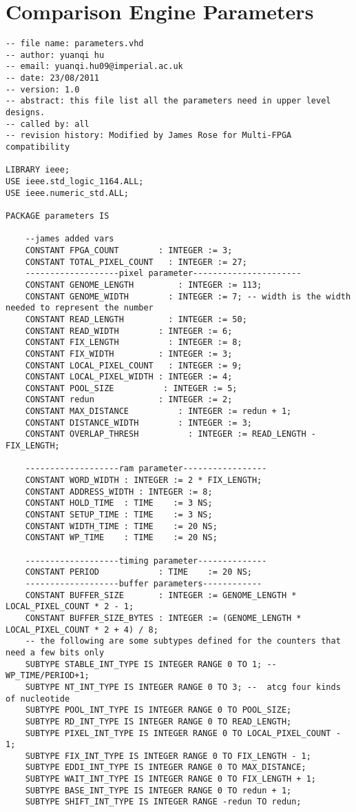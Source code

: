 \renewcommand{\baselinestretch}{1.5}
\chapter{Comparison Engine Parameters}
\label{App:default}

\lstset{language=python, numbers=left, showspaces=false,
    showstringspaces=false, tabsize=4, breaklines=true, basicstyle=\tiny, captionpos=b, numbersep=5pt }
\begin{lstlisting}[frame=single]
-- file name: parameters.vhd
-- author: yuanqi hu
-- email: yuanqi.hu09@imperial.ac.uk
-- date: 23/08/2011
-- version: 1.0
-- abstract: this file list all the parameters need in upper level designs.
-- called by: all
-- revision history: Modified by James Rose for Multi-FPGA compatibility

LIBRARY ieee;
USE ieee.std_logic_1164.ALL;
USE ieee.numeric_std.ALL;

PACKAGE parameters IS

	--james added vars
	CONSTANT FPGA_COUNT        : INTEGER := 3;
	CONSTANT TOTAL_PIXEL_COUNT   : INTEGER := 27;
	-------------------pixel parameter----------------------
	CONSTANT GENOME_LENGTH         : INTEGER := 113;
	CONSTANT GENOME_WIDTH        : INTEGER := 7; -- width is the width needed to represent the number
	CONSTANT READ_LENGTH         : INTEGER := 50;
	CONSTANT READ_WIDTH        : INTEGER := 6;
	CONSTANT FIX_LENGTH          : INTEGER := 8;
	CONSTANT FIX_WIDTH         : INTEGER := 3;
	CONSTANT LOCAL_PIXEL_COUNT   : INTEGER := 9;
	CONSTANT LOCAL_PIXEL_WIDTH : INTEGER := 4;
	CONSTANT POOL_SIZE          : INTEGER := 5;
	CONSTANT redun             : INTEGER := 2;
	CONSTANT MAX_DISTANCE          : INTEGER := redun + 1;
	CONSTANT DISTANCE_WIDTH        : INTEGER := 3;
	CONSTANT OVERLAP_THRESH          : INTEGER := READ_LENGTH - FIX_LENGTH;

	-------------------ram parameter-----------------
	CONSTANT WORD_WIDTH : INTEGER := 2 * FIX_LENGTH;
	CONSTANT ADDRESS_WIDTH : INTEGER := 8;
	CONSTANT HOLD_TIME  : TIME    := 3 NS;
	CONSTANT SETUP_TIME : TIME    := 3 NS;
	CONSTANT WIDTH_TIME : TIME    := 20 NS;
	CONSTANT WP_TIME    : TIME    := 20 NS;

	-------------------timing parameter--------------
	CONSTANT PERIOD            : TIME    := 20 NS;
	-------------------buffer parameters------------
	CONSTANT BUFFER_SIZE       : INTEGER := GENOME_LENGTH * LOCAL_PIXEL_COUNT * 2 - 1;
	CONSTANT BUFFER_SIZE_BYTES : INTEGER := (GENOME_LENGTH * LOCAL_PIXEL_COUNT * 2 + 4) / 8;
	-- the following are some subtypes defined for the counters that need a few bits only
	SUBTYPE STABLE_INT_TYPE IS INTEGER RANGE 0 TO 1; --  WP_TIME/PERIOD+1;
	SUBTYPE NT_INT_TYPE IS INTEGER RANGE 0 TO 3; --  atcg four kinds of nucleotide
	SUBTYPE POOL_INT_TYPE IS INTEGER RANGE 0 TO POOL_SIZE;
	SUBTYPE RD_INT_TYPE IS INTEGER RANGE 0 TO READ_LENGTH;
	SUBTYPE PIXEL_INT_TYPE IS INTEGER RANGE 0 TO LOCAL_PIXEL_COUNT - 1;
	SUBTYPE FIX_INT_TYPE IS INTEGER RANGE 0 TO FIX_LENGTH - 1;
	SUBTYPE EDDI_INT_TYPE IS INTEGER RANGE 0 TO MAX_DISTANCE;
	SUBTYPE WAIT_INT_TYPE IS INTEGER RANGE 0 TO FIX_LENGTH + 1;
	SUBTYPE BASE_INT_TYPE IS INTEGER RANGE 0 TO redun + 1;
	SUBTYPE SHIFT_INT_TYPE IS INTEGER RANGE -redun TO redun;


\end{lstlisting}

